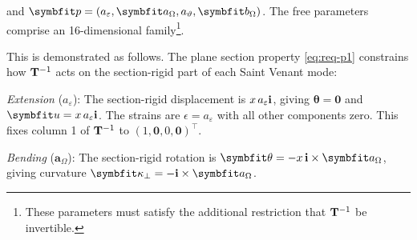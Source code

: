 and $\bm{p} = (a_\varepsilon, \bm{a}_\Omega, a_\vartheta, \bm{b}_{\Section})$.
The free parameters comprise an 16-dimensional family\footnote{These parameters must satisfy the additional restriction that ${\mathbf{T}^{-1}}$ be invertible.}.

This is demonstrated as follows. 
The plane section property \eqref{eq:req-p1} constrains how ${\mathbf{T}^{-1}}$ acts on the section-rigid part of each Saint Venant mode:

\textit{Extension} ($a_\varepsilon$): The section-rigid displacement is 
$x\,a_\varepsilon\mathbf{i}$, giving $\bm{\theta} = \mathbf{0}$ and 
$\bm{u} = x\,a_\varepsilon\FrameBasis$. The strains are 
$\epsilon = a_\varepsilon$ with all other components zero. 
This fixes column 1 of ${\mathbf{T}^{-1}}$ to $(1, \mathbf{0}, 0, \mathbf{0})^\top$.

\textit{Bending} ($\bm{a}_\Omega$): The section-rigid rotation is 
$\bm{\theta} = -x\,\FrameBasis \times \bm{a}_\Omega$, giving curvature 
$\bm{\kappa}_\perp = -\FrameBasis \times \bm{a}_\Omega$. 


